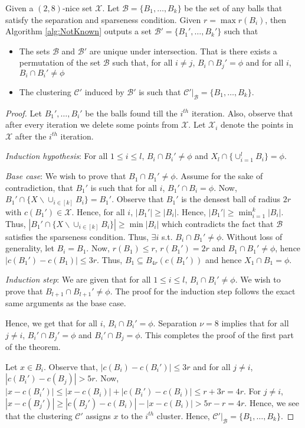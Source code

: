 \documentclass[11pt]{article}
\newcommand{\mc}{\mathcal}
\begin{document}
\begin{theorem}
Given a $(2,8)$-nice set $\mc X$. Let $\mc B = \{B_1,\ldots,B_k\}$ be the set of any balls that satisfy the separation and sparseness condition. Given $r = \max r(B_i)$, then Algorithm \ref{alg:NotKnown} outputs a set $\mc B' = \{B_1',\ldots,B_k'\}$ such that 
\begin{itemize}
	\item The sets $\mc B$ and $\mc B'$ are unique under intersection. That is there exists a permutation of the set $\mc B$ such that, for all $i\neq j$, $B_i \cap B_j' = \phi$ and for all $i$, $B_i \cap B_i' \neq \phi$
	\item The clustering $\mc C'$ induced by $\mc B'$ is such that $\mc C'|_\mc B = \{B_1,\ldots,B_k\}$.	
\end{itemize}

\end{theorem}
\begin{proof} Let $B_1',\ldots,B_i'$ be the balls found till the $i^{th}$ iteration. Also, observe that after every iteration we delete some points from $\mc X$. Let $\mc X_i$ denote the points in $\mc X$ after the $i^{th}$ iteration. 

\textit{Induction hypothesis}: For all $1\le i \le l$, $B_i \cap B_i' \neq \phi$ and $X_l \cap \{\cup_{i=1}^l B_i\} = \phi$.

\textit{Base case}: We wish to prove that $B_1 \cap B_1' \neq \phi$. Assume for the sake of contradiction, that $B_1'$ is such that for all $i$, $B_1' \cap B_i = \phi$. Now, $B_1' \cap \{X \backslash \cup_{i\in[k]} B_i\} = B_1'$. Observe that $B_1'$ is the densest ball of radius $2r$ with $c(B_1') \in \mathcal{X}$. Hence, for all $i$, $|B_1'| \ge |B_i|$. Hence, $|B_1'| \ge \min_{i=1}^k |B_i|$. Thus, $|B_1' \cap \{X \backslash \cup_{i\in[k]} B_i\}| \ge \min |B_i|$ which contradicts the fact that $\mc B$ satisfies the sparseness condition. Thus, $\exists i$ s.t. $B_i \cap B_1' \neq \phi$. Without loss of generality, let $B_i = B_1$. Now, $r(B_1) \le r$, $r(B_1') = 2r$ and $B_1 \cap B_1' \neq \phi$, hence $|c(B_1')-c(B_1)| \le 3r$. Thus, $B_1 \subseteq B_{4r}(c(B_1'))$ and hence $X_1 \cap B_1 = \phi$. 

\textit{Induction step}: We are given that for all $1\le i \le l$, $B_i \cap B_i' \neq \phi$. We wish to prove that $B_{l+1} \cap B_{l+1}' \neq \phi$. The proof for the induction step follows the exact same arguments as the base case.

Hence, we get that for all $i$, $B_i \cap B_i' = \phi$. Separation $\nu = 8$ implies that for all $j\neq i$, $B_i' \cap B_j' = \phi$ and $B_i' \cap B_j = \phi$. This completes the proof of the first part of the theorem.

Let $x \in B_i$. Observe that, $|c(B_i)-c(B_i')| \le 3r$ and for all $j\neq i$, $|c(B_i')-c(B_j)| > 5r$. Now, $|x-c(B_i')| \le |x-c(B_i)| + |c(B_i')-c(B_i)| \le r+3r = 4r$. For $j \neq i$, $|x-c(B_j')| \ge |c(B_j')-c(B_i)| - |x-c(B_i)| > 5r - r = 4r$. Hence, we see that the clustering $\mc C'$ assigns $x$ to the $i^{th}$ cluster. Hence, $\mc C'|_\mc B = \{B_1,\ldots,B_k\}$.
\end{proof}
\end{document}
